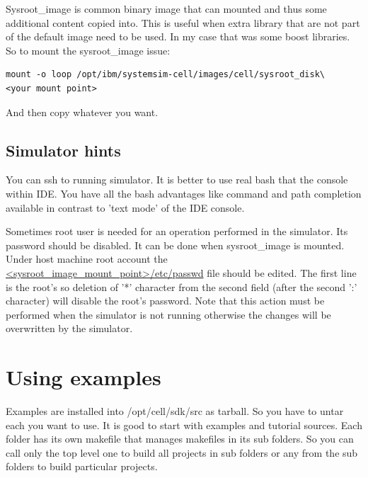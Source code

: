 Sysroot\_image is common binary image that can mounted and thus some additional content copied into.
This is useful when extra library that are not part of the default image need to be used.
In my case that was some boost libraries. So to mount the sysroot\_image issue:
\begin{verbatim}
mount -o loop /opt/ibm/systemsim-cell/images/cell/sysroot_disk\
<your mount point>
\end{verbatim}
And then copy whatever you want.

\subsection{Simulator hints}

\par
You can ssh to running simulator. It is better to use real bash that the console within IDE.
You have all the bash advantages like command and path completion available in contrast to 'text mode' of the IDE console.

\par
Sometimes root user is needed for an operation performed in the simulator.
Its password should be disabled.
It can be done when sysroot\_image is mounted.
Under host machine root account the \url{<sysroot_image_mount_point>/etc/passwd} file should be edited.
The first line is the root's so deletion of '*' character from the second field (after the second ':' character) will disable the root's password.
Note that this action must be performed when the simulator is not running otherwise the changes will be overwritten by the simulator.

\section{Using examples}

Examples are installed into /opt/cell/sdk/src as tarball.
So you have to untar each you want to use.
It is good to start with examples and tutorial sources.
Each folder has its own makefile that manages makefiles in its sub folders.
So you can call only the top level one to build all projects in sub folders or any from the sub folders to build particular projects.

